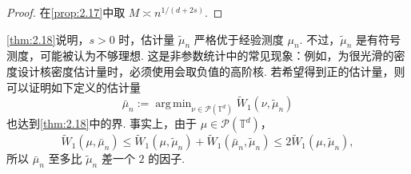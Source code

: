 \begin{proof}
在\autoref{prop:2.17}中取 $M\asymp n^{1/(d+2s)}$.
\end{proof}
\autoref{thm:2.18}说明，$s>0$ 时，估计量 $\tilde\mu_n$ 严格优于经验测度 $\mu_n$. 不过，$\tilde\mu_n$ 是有符号测度，可能被认为不够理想. 这是非参数统计中的常见现象：例如，为很光滑的密度设计核密度估计量时，必须使用会取负值的高阶核. 若希望得到正的估计量，则可以证明如下定义的估计量
$$\bar\mu_n:=\mathop{\mathrm{arg\,min}}_{\nu\in\mathcal P(\mathbb T^d)}\widetilde W_1(\nu,\tilde\mu_n)$$
也达到\autoref{thm:2.18}中的界. 事实上，由于 $\mu\in\mathcal P(\mathbb T^d)$，
$$\widetilde W_1(\mu,\bar\mu_n)
\le\widetilde W_1(\mu,\tilde\mu_n)+\widetilde W_1(\bar\mu_n,\tilde\mu_n)
\le2\widetilde W_1(\mu,\tilde\mu_n),$$
所以 $\bar\mu_n$ 至多比 $\tilde\mu_n$ 差一个 $2$ 的因子.
